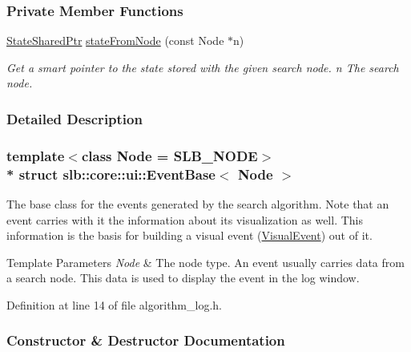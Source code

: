 \subsubsection*{Private Member Functions}
\begin{DoxyCompactItemize}
\item 
\hyperlink{structslb_1_1core_1_1ui_1_1EventBase_a50419d00607aad434bb97138eabe2c94}{State\+Shared\+Ptr} \hyperlink{structslb_1_1core_1_1ui_1_1EventBase_ad4b4485000eba6045376fc3ca55ac2ac}{state\+From\+Node} (const Node $\ast$n)
\begin{DoxyCompactList}\small\item\em Get a smart pointer to the state stored with the given search node. n The search node. \end{DoxyCompactList}\end{DoxyCompactItemize}


\subsubsection{Detailed Description}
\subsubsection*{template$<$class Node = S\+L\+B\+\_\+\+N\+O\+DE$>$\\*
struct slb\+::core\+::ui\+::\+Event\+Base$<$ Node $>$}

The base class for the events generated by the search algorithm. Note that an event carries with it the information about its visualization as well. This information is the basis for building a visual event (\hyperlink{structslb_1_1core_1_1ui_1_1VisualEvent}{Visual\+Event}) out of it. 


\begin{DoxyTemplParams}{Template Parameters}
{\em Node} & The node type. An event usually carries data from a search node. This data is used to display the event in the log window. \\
\hline
\end{DoxyTemplParams}


Definition at line 14 of file algorithm\+\_\+log.\+h.



\subsubsection{Constructor \& Destructor Documentation}
